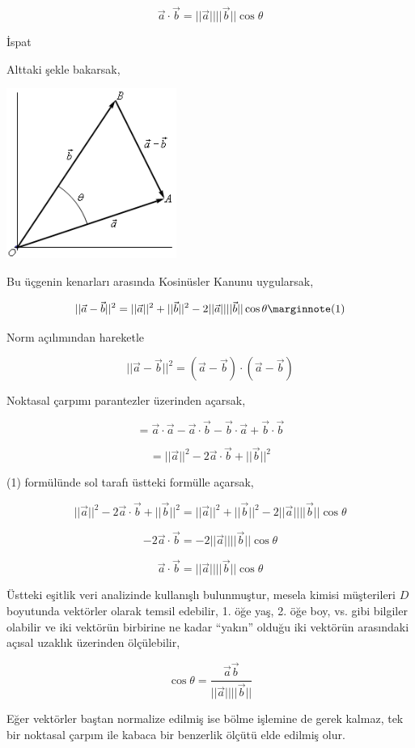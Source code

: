 \documentclass[12pt,fleqn]{article}\usepackage{../../common}
\begin{document}
$$
\vec{a} \cdot \vec{b} = ||\vec{a}|| ||\vec{b}|| \cos\theta
$$

İspat

Alttaki şekle bakarsak,

\includegraphics[width=15em]{abcos.png}

Bu üçgenin kenarları arasında Kosinüsler Kanunu uygularsak,

$$
||\vec{a}-\vec{b}||^2 =
||\vec{a}||^2 + ||\vec{b}||^2 -
2 ||\vec{a}|| ||\vec{b}|| \cos\theta
\mlabel{1}
$$

Norm açılımından hareketle

$$
||\vec{a}-\vec{b}||^2 = (\vec{a}-\vec{b}) \cdot (\vec{a}-\vec{b}) 
$$

Noktasal çarpımı parantezler üzerinden açarsak,

$$
= \vec{a}\cdot\vec{a} - \vec{a}\cdot\vec{b} - \vec{b}\cdot\vec{a} + \vec{b}\cdot\vec{b}
$$

$$
= ||\vec{a}||^2 - 2\vec{a}\cdot\vec{b} + ||\vec{b}||^2
$$

(1) formülünde sol tarafı üstteki formülle açarsak,

$$
||\vec{a}||^2 - 2\vec{a}\cdot\vec{b} + ||\vec{b}||^2 =
||\vec{a}||^2 + ||\vec{b}||^2 - 2 ||\vec{a}|| ||\vec{b}|| \cos\theta
$$

$$
- 2\vec{a}\cdot\vec{b} = - 2 ||\vec{a}|| ||\vec{b}|| \cos\theta
$$

$$
\vec{a}\cdot\vec{b} = ||\vec{a}|| ||\vec{b}|| \cos\theta
$$

Üstteki eşitlik veri analizinde kullanışlı bulunmuştur, mesela kimisi
müşterileri $D$ boyutunda vektörler olarak temsil edebilir, 1. öğe yaş, 2. öğe
boy, vs. gibi bilgiler olabilir ve iki vektörün birbirine ne kadar ``yakın''
olduğu iki vektörün arasındaki açısal uzaklık üzerinden ölçülebilir,

$$
\cos\theta = \frac{\vec{a}\vec{b}}{||\vec{a}|| ||\vec{b}||}
$$

Eğer vektörler baştan normalize edilmiş ise bölme işlemine de gerek kalmaz, tek
bir noktasal çarpım ile kabaca bir benzerlik ölçütü elde edilmiş olur.
\end{document}
